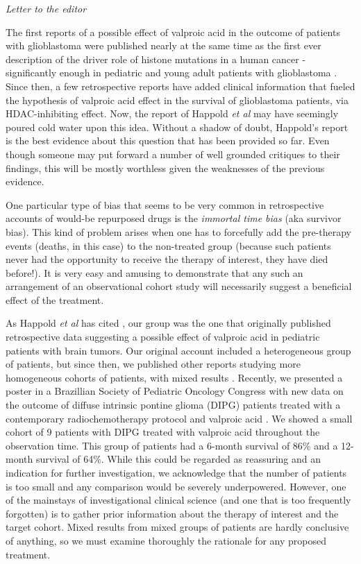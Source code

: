 \textit{Letter to the editor} 

The first reports \cite{Happold_2016} of a possible effect of valproic acid in the outcome of patients with glioblastoma were published nearly at the same time as the first ever description of the driver role of histone mutations in a human cancer - significantly enough in pediatric and young adult patients with glioblastoma \cite{Schwartzentruber_2012}. Since then, a few retrospective reports have added clinical information that fueled the hypothesis of valproic acid effect in the survival of glioblastoma patients, via HDAC-inhibiting effect. Now, the report of Happold \textit{et al} \cite{Happold_2016} may have seemingly poured cold water upon this idea. Without a shadow of doubt, Happold's report is the best evidence about this question that has been provided so far. Even though someone may put forward a number of well grounded critiques to their findings, this will be mostly worthless given the weaknesses of the previous evidence. 

One particular type of bias that seems to be very common in retrospective accounts of would-be repurposed drugs is the \textit{immortal time bias} \cite{Ho_2012} (aka survivor bias). This kind of problem arises when one has to forcefully add the pre-therapy events (deaths, in this case) to the non-treated group (because such patients never had the opportunity to receive the therapy of interest, they have died before!). It is very easy and amusing to demonstrate that any such an arrangement of an observational cohort study will necessarily suggest a beneficial effect of the treatment. 

As Happold \textit{et al} has cited \cite{Happold_2016}, our group was the one that originally published retrospective data suggesting a possible effect of valproic acid in pediatric patients with brain tumors. Our original account included a heterogeneous group of patients, but since then, we published other reports studying more homogeneous cohorts of patients, with mixed results \cite{Felix_2012}. Recently, we presented a poster in a Brazillian Society of Pediatric Oncology Congress with new data on the outcome of diffuse intrinsic pontine glioma (DIPG) patients treated with a contemporary radiochemotherapy protocol and valproic acid \cite{59c42273-d778-4fe5-8019-07a0e4509517}. We showed a small cohort of 9 patients with DIPG treated with valproic acid throughout the observation time. This group of patients had a 6-month survival of 86\% and a 12-month survival of 64\%. While this could be regarded as reassuring and an indication for further investigation, we acknowledge that the number of patients is too small and any comparison would be severely underpowered. However, one of the mainstays of investigational clinical science (and one that is too frequently forgotten) is to gather prior information about the therapy of interest and the target cohort. Mixed results from mixed groups of patients are hardly conclusive of anything, so we must examine thoroughly the rationale for any proposed treatment. 

